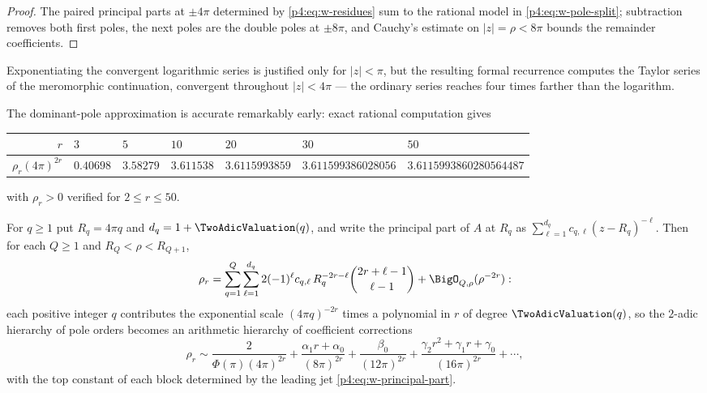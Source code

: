 \documentclass[11pt,oneside]{article}
\numberwithin{equation}{section}
\theoremstyle{definition}
\theoremstyle{remark}
\begin{document}
\begin{proof}
The paired principal parts at $\pm4\pi$ determined by
\eqref{p4:eq:w-residues} sum to the rational model in
\eqref{p4:eq:w-pole-split}; subtraction removes both first poles, the next
poles are the double poles at $\pm8\pi$, and Cauchy's estimate on
$|z|=\rho<8\pi$ bounds the remainder coefficients.
\end{proof}

Exponentiating the convergent logarithmic series is justified only for
$|z|<\pi$, but the resulting formal recurrence computes the Taylor series of
the meromorphic continuation, convergent throughout $|z|<4\pi$ --- the
ordinary series reaches four times farther than the logarithm.

The dominant-pole approximation is accurate remarkably early: exact rational
computation gives
\begin{center}
\footnotesize
\begin{tabular}{@{}rllllll@{}}
\toprule
$r$ & $3$ & $5$ & $10$ & $20$ & $30$ & $50$\\
\midrule
$\rho_r(4\pi)^{2r}$ & $0.40698$ & $3.58279$ & $3.611538$
 & $3.6115993859$ & $3.611599386028056$ & $3.6115993860280564487$\\
\bottomrule
\end{tabular}
\end{center}
with $\rho_r>0$ verified for $2\le r\le50$.

\begin{proposition}
\label{p4:prop:w-darboux}
For $q\ge1$ put $R_q=4\pi q$ and $d_q=1+\TwoAdicValuation(q)$, and write the principal
part of $A$ at $R_q$ as
$\sum_{\ell=1}^{d_q}c_{q,\ell}(z-R_q)^{-\ell}$.  Then for each $Q\ge1$ and
$R_Q<\rho<R_{Q+1}$,
\begin{equation}
 \rho_r=\sum_{q=1}^{Q}\sum_{\ell=1}^{d_q}
 2(-1)^\ell c_{q,\ell}\,R_q^{-2r-\ell}
 \binom{2r+\ell-1}{\ell-1}
 +\BigO_{Q,\rho}(\rho^{-2r}):
 \label{p4:eq:w-darboux}
\end{equation}
each positive integer $q$ contributes the exponential scale $(4\pi q)^{-2r}$
times a polynomial in $r$ of degree $\TwoAdicValuation(q)$, so the $2$-adic hierarchy of
pole orders becomes an arithmetic hierarchy of coefficient corrections
\begin{equation}
 \rho_r\sim\frac{2}{\Phi(\pi)(4\pi)^{2r}}
 +\frac{\alpha_1r+\alpha_0}{(8\pi)^{2r}}
 +\frac{\beta_0}{(12\pi)^{2r}}
 +\frac{\gamma_2r^2+\gamma_1r+\gamma_0}{(16\pi)^{2r}}+\cdots,
 \label{p4:eq:w-transseries}
\end{equation}
with the top constant of each block determined by the leading jet
\eqref{p4:eq:w-principal-part}.
\end{proposition}
\end{document}
